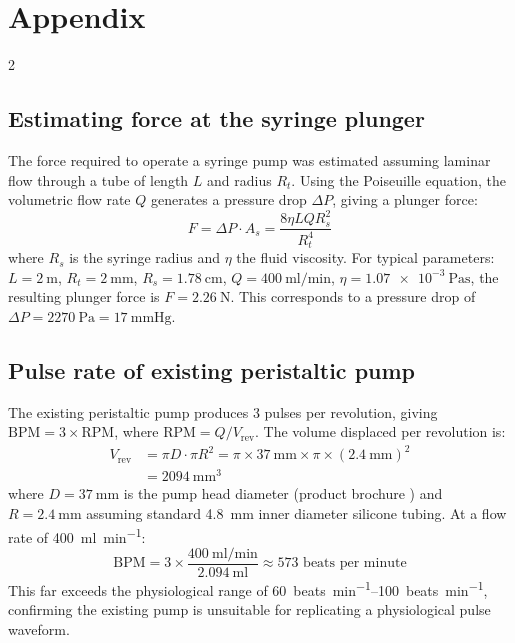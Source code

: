\documentclass[10pt, a4paper]{article}
\begin{document}
\section{Appendix}
\begin{multicols}{2}

    \subsection{Estimating force at the syringe plunger}
    The force required to operate a syringe pump was estimated assuming laminar flow through a tube of length $L$ and radius $R_t$. Using the Poiseuille equation, the volumetric flow rate $Q$ generates a pressure drop $\Delta P$, giving a plunger force:
    \begin{equation*}
        F = \Delta P \cdot A_s = \frac{8 \eta L Q R_s^2}{R_t^4}
    \end{equation*}
    where $R_s$ is the syringe radius and $\eta$ the fluid viscosity. For typical parameters: $L = \SI{2}{\metre}$, $R_t = \SI{2}{\milli\metre}$, $R_s = \SI{1.78}{\centi\metre}$, $Q = \SI{400}{\milli\litre\per\minute}$, $\eta = \SI{1.07e-3}{\pascal\second}$, the resulting plunger force is $F = \SI{2.26}{\newton}$. This corresponds to a pressure drop of $\Delta P = \SI{2270}{\pascal} = \SI{17}{\mmHg}$.

    \subsection{Pulse rate of existing peristaltic pump}

    The existing peristaltic pump produces 3 pulses per revolution, giving $\text{BPM} = 3 \times \text{RPM}$, where $\text{RPM} = Q / V_\text{rev}$. The volume displaced per revolution is:
    \begin{align*}
        V_\text{rev} & = \pi D \cdot \pi R^2 = \pi \times \qty{37}{\milli\metre} \times \pi \times (\qty{2.4}{\milli\metre})^2 \\
                     & = \qty{2094}{\milli\metre\cubed}
    \end{align*}
    where $D = \qty{37}{\milli\metre}$ is the pump head diameter (product brochure \cite{KamoerKK1800Peristaltic}) and $R = \qty{2.4}{\milli\metre}$ assuming standard \qty{4.8}{\milli\metre} inner diameter silicone tubing. At a flow rate of \qty{400}{\milli\litre\per\minute}:
    \begin{equation}
        \text{BPM} = 3 \times \frac{\qty{400}{\milli\litre\per\minute}}{\qty{2.094}{\milli\litre}} \approx 573 \text{ beats per minute}
    \end{equation}
    This far exceeds the physiological range of \qtyrange{60}{100}{beats\per\minute}, confirming the existing pump is unsuitable for replicating a physiological pulse waveform.


\end{multicols}
\end{document}
